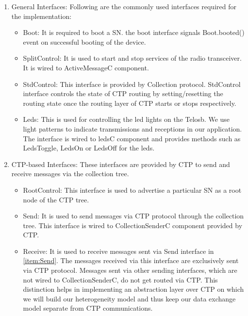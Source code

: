     \begin{enumerate}
        \item General Interfaces: Following are the commonly used interfaces required for the implementation: 
    
            \begin{itemize}
                \item Boot: It is required to boot a \ac{SN}. the boot interface signals Boot.booted() event on successful booting of the device.
                
                \item SplitControl: It is used to start and stop services of the radio transceiver. It is wired to ActiveMessageC component.
                
                \item StdControl: This interface is provided by Collection protocol. StdControl interface  controls the state of \ac{CTP} routing by setting/resetting the routing state once the routing layer of \ac{CTP} starts or stops respectively.
                
                \item Leds: This is used for controlling the led lights on the Telosb. We use light patterns to indicate transmissions and receptions in our application. The interface is wired to ledsC component and provides methods such as LedsToggle, LedsOn or LedsOff for the leds.
            \end{itemize}
        
        \item CTP-based Interfaces: These interfaces are provided by \ac{CTP} to send and receive messages via the collection tree. 
        
            \begin{itemize}
                \item RootControl: This interface is used to advertise a particular \ac{SN} as a root node of the \ac{CTP} tree.
            
                \item {\label{item:Send}} Send: It is used to send messages via \ac{CTP} protocol through the collection tree. This interface is wired to CollectionSenderC component provided by \ac{CTP}.
                
                \item Receive: It is used to receive messages sent via Send interface in \ref{item:Send}. The messages received via this interface are exclusively sent via \ac{CTP} protocol. Messages sent via other sending interfaces, which are not wired to CollectionSenderC, do not get routed via \ac{CTP}. This distinction helps in implementing an abstraction layer over \ac{CTP} on which we will build our heterogeneity model and thus keep our data exchange model separate from \ac{CTP} communications.
                

\end{itemize}
\end{enumerate}
